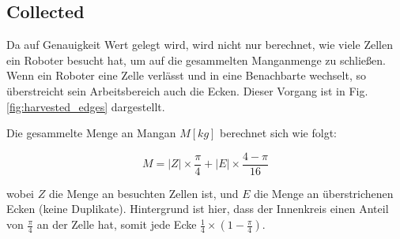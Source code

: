 \documentclass{article}
\begin{document}
\subsection{Collected}

Da auf Genauigkeit Wert gelegt wird, wird nicht nur berechnet, wie viele Zellen ein Roboter besucht hat, um auf die gesammelten Manganmenge zu schließen. Wenn ein Roboter eine Zelle verlässt und in eine Benachbarte wechselt, so überstreicht sein Arbeitsbereich auch die Ecken. Dieser Vorgang ist in Fig. \ref{fig:harvested_edges} dargestellt. 

Die gesammelte Menge an Mangan $M [kg]$  berechnet sich wie folgt:

\begin{equation*}
M = |Z| \times \frac{\pi}{4} + |E| \times \frac{4-\pi}{16}
\end{equation*}

wobei $Z$ die Menge an besuchten Zellen ist, und $E$ die Menge an überstrichenen Ecken (keine Duplikate). Hintergrund ist hier, 
dass der Innenkreis einen Anteil von $\frac{\pi}{4}$ an der Zelle hat, somit jede Ecke $ \frac{1}{4} \times (1- \frac{\pi}{4}) $.
\end{document}
